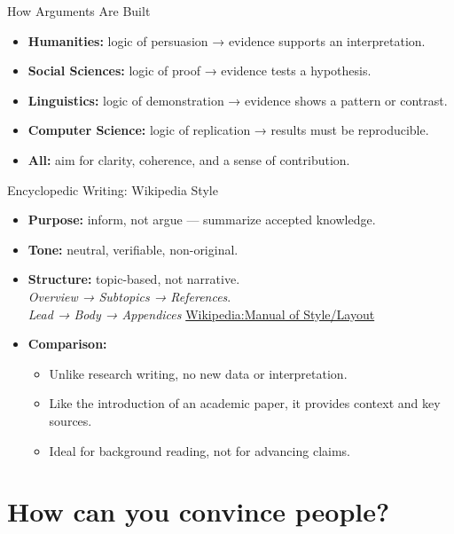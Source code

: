 \documentclass[aspectratio=169]{beamer}
\begin{document}
\begin{frame}{How Arguments Are Built}
\begin{itemize}
  \item \textbf{Humanities:} logic of persuasion → evidence supports an interpretation.
  \item \textbf{Social Sciences:} logic of proof → evidence tests a hypothesis.
  \item \textbf{Linguistics:} logic of demonstration → evidence shows a pattern or contrast.
  \item \textbf{Computer Science:} logic of replication → results must be reproducible.
  \item \textbf{All:} aim for clarity, coherence, and a sense of contribution.
\end{itemize}
\end{frame}

\begin{frame}{Encyclopedic Writing: Wikipedia Style}
\begin{itemize}
  \item \textbf{Purpose:} inform, not argue — summarize accepted knowledge.
  \item \textbf{Tone:} neutral, verifiable, non-original.
  \item \textbf{Structure:} topic-based, not narrative.  
    \\  \textit{Overview → Subtopics → References}.
    \\ \textit{Lead →  Body →  Appendices} \hfill \href{https://en.wikipedia.org/wiki/Wikipedia:Manual_of_Style/Layout}{Wikipedia:Manual of Style/Layout}
  \item \textbf{Comparison:}
    \begin{itemize}
      \item Unlike research writing, no new data or interpretation.  
      \item Like the introduction of an academic paper, it provides context and key sources.  
      \item Ideal for background reading, not for advancing claims.
    \end{itemize}
\end{itemize}
\end{frame}






\section{How can you convince people?}
\end{document}

